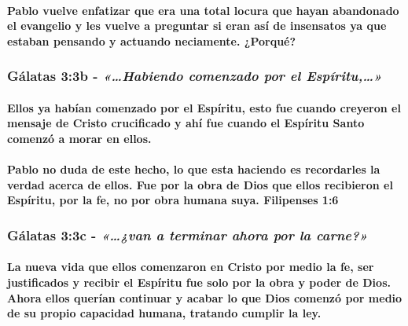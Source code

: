\documentclass[11a pt,twoside]{article}
\newcommand{\scripture}[1]{%
  {\fontsize{12pt}{16pt}\selectfont\ScriptureFont\itshape #1}%
}
\let\oldsubsubsection\subsubsection
\renewcommand{\subsubsection}{\needspace{4\baselineskip}\oldsubsubsection}
\let\oldparagraph\paragraph
\renewcommand{\paragraph}{\needspace{3\baselineskip}\oldparagraph}
\begin{document}
\paragraph{Pablo vuelve enfatizar que era una total locura que hayan
abandonado el evangelio y les vuelve a preguntar si eran así de
insensatos ya que estaban pensando y actuando neciamente.
¿Porqué?}\label{pablo-vuelve-enfatizar-que-era-una-total-locura-que-hayan-abandonado-el-evangelio-y-les-vuelve-a-preguntar-si-eran-asuxed-de-insensatos-ya-que-estaban-pensando-y-actuando-neciamente.-porquuxe9}

\subsubsection{\texorpdfstring{Gálatas 3:3b -
\scripture{«…Habiendo comenzado por el Espíritu,…»}}{Gálatas 3:3b - }}\label{guxe1latas-33b---habiendo-comenzado-por-el-espuxedritu}

\paragraph{Ellos ya habían comenzado por el Espíritu, esto fue cuando
creyeron el mensaje de Cristo crucificado y ahí fue cuando el Espíritu
Santo comenzó a morar en
ellos.}\label{ellos-ya-habuxedan-comenzado-por-el-espuxedritu-esto-fue-cuando-creyeron-el-mensaje-de-cristo-crucificado-y-ahuxed-fue-cuando-el-espuxedritu-santo-comenzuxf3-a-morar-en-ellos.}

\paragraph{Pablo no duda de este hecho, lo que esta haciendo es
recordarles la verdad acerca de ellos. Fue por la obra de Dios que ellos
recibieron el Espíritu, por la fe, no por obra humana suya. Filipenses
1:6}\label{pablo-no-duda-de-este-hecho-lo-que-esta-haciendo-es-recordarles-la-verdad-acerca-de-ellos.-fue-por-la-obra-de-dios-que-ellos-recibieron-el-espuxedritu-por-la-fe-no-por-obra-humana-suya.-filipenses-16}

\subsubsection{\texorpdfstring{Gálatas 3:3c -
\scripture{«…¿van a terminar ahora por la carne?»}}{Gálatas 3:3c - }}\label{guxe1latas-33c---van-a-terminar-ahora-por-la-carne}

\paragraph{La nueva vida que ellos comenzaron en Cristo por medio la fe,
ser justificados y recibir el Espíritu fue solo por la obra y poder de
Dios. Ahora ellos querían continuar y acabar lo que Dios comenzó por
medio de su propio capacidad humana, tratando cumplir la
ley.}\label{la-nueva-vida-que-ellos-comenzaron-en-cristo-por-medio-la-fe-ser-justificados-y-recibir-el-espuxedritu-fue-solo-por-la-obra-y-poder-de-dios.-ahora-ellos-queruxedan-continuar-y-acabar-lo-que-dios-comenzuxf3-por-medio-de-su-propio-capacidad-humana-tratando-cumplir-la-ley.}
\end{document}

